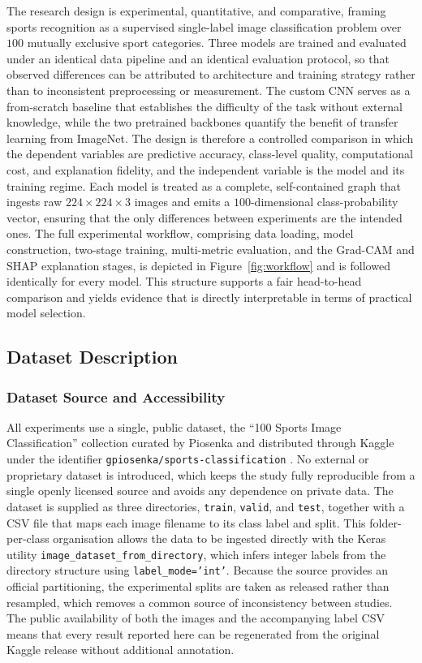 The research design is experimental, quantitative, and comparative, framing sports recognition as a supervised single-label image classification problem over $100$ mutually exclusive sport categories.
Three models are trained and evaluated under an identical data pipeline and an identical evaluation protocol, so that observed differences can be attributed to architecture and training strategy rather than to inconsistent preprocessing or measurement.
The custom CNN serves as a from-scratch baseline that establishes the difficulty of the task without external knowledge, while the two pretrained backbones quantify the benefit of transfer learning from ImageNet.
The design is therefore a controlled comparison in which the dependent variables are predictive accuracy, class-level quality, computational cost, and explanation fidelity, and the independent variable is the model and its training regime.
Each model is treated as a complete, self-contained graph that ingests raw $224\times224\times3$ images and emits a $100$-dimensional class-probability vector, ensuring that the only differences between experiments are the intended ones.
The full experimental workflow, comprising data loading, model construction, two-stage training, multi-metric evaluation, and the Grad-CAM and SHAP explanation stages, is depicted in Figure~\ref{fig:workflow} and is followed identically for every model.
This structure supports a fair head-to-head comparison and yields evidence that is directly interpretable in terms of practical model selection.

\subsection{Dataset Description}
\label{subsec:method-dataset}

\subsubsection{Dataset Source and Accessibility}
\label{subsubsec:method-source}

All experiments use a single, public dataset, the ``100 Sports Image Classification'' collection curated by Piosenka and distributed through Kaggle under the identifier \texttt{gpiosenka/sports-classification} \citep{piosenka2022sports}.
No external or proprietary dataset is introduced, which keeps the study fully reproducible from a single openly licensed source and avoids any dependence on private data.
The dataset is supplied as three directories, \texttt{train}, \texttt{valid}, and \texttt{test}, together with a CSV file that maps each image filename to its class label and split.
This folder-per-class organisation allows the data to be ingested directly with the Keras utility \texttt{image\_dataset\_from\_directory}, which infers integer labels from the directory structure using \texttt{label\_mode='int'}.
Because the source provides an official partitioning, the experimental splits are taken as released rather than resampled, which removes a common source of inconsistency between studies.
The public availability of both the images and the accompanying label CSV means that every result reported here can be regenerated from the original Kaggle release without additional annotation.

